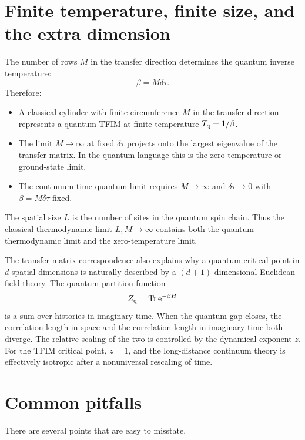 \section{Finite temperature, finite size, and the extra dimension}
\label{sec:ising-tfim-finite-temperature-finite-size}

The number of rows $M$ in the transfer direction determines the quantum inverse
temperature:
\begin{equation}
    \beta=M\delta\tau .
\end{equation}
Therefore:
\begin{itemize}[leftmargin=2.0em]
    \item A classical cylinder with finite circumference $M$ in the transfer
    direction represents a quantum TFIM at finite temperature $T_{\rm q}=1/\beta$.
    \item The limit $M\to\infty$ at fixed $\delta\tau$ projects onto the largest
    eigenvalue of the transfer matrix.  In the quantum language this is the
    zero-temperature or ground-state limit.
    \item The continuum-time quantum limit requires $M\to\infty$ and
    $\delta\tau\to0$ with $\beta=M\delta\tau$ fixed.
\end{itemize}
The spatial size $L$ is the number of sites in the quantum spin chain.  Thus the
classical thermodynamic limit $L,M\to\infty$ contains both the quantum
thermodynamic limit and the zero-temperature limit.

The transfer-matrix correspondence also explains why a quantum critical point in
$d$ spatial dimensions is naturally described by a $(d+1)$-dimensional Euclidean
field theory.  The quantum partition function
\begin{equation}
    Z_{\rm q}=\operatorname{Tr}\mathrm{e}^{-\beta H}
\end{equation}
is a sum over histories in imaginary time.  When the quantum gap closes, the
correlation length in space and the correlation length in imaginary time both
diverge.  The relative scaling of the two is controlled by the dynamical exponent
$z$.  For the TFIM critical point, $z=1$, and the long-distance continuum theory
is effectively isotropic after a nonuniversal rescaling of time.

\section{Common pitfalls}
\label{sec:ising-tfim-common-pitfalls}

There are several points that are easy to misstate.

